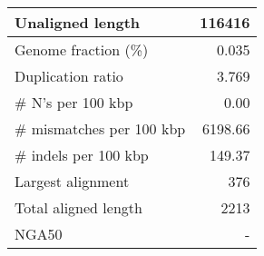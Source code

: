 \documentclass[12pt,a4paper]{article}
\begin{document}
\begin{table}[ht]
\begin{center}
\begin{tabular}{|l*{1}{|r}|}
Unaligned length & 116416 \\ \hline
Genome fraction (\%) & 0.035 \\ \hline
Duplication ratio & 3.769 \\ \hline
\# N's per 100 kbp & 0.00 \\ \hline
\# mismatches per 100 kbp & 6198.66 \\ \hline
\# indels per 100 kbp & 149.37 \\ \hline
Largest alignment & 376 \\ \hline
Total aligned length & 2213 \\ \hline
NGA50 & - \\ \hline
\end{tabular}
\end{center}
\end{table}
\end{document}
